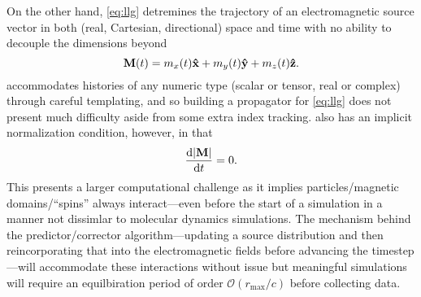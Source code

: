 On the other hand, \cref{eq:llg} detremines the trajectory of an electromagnetic source vector in both (real, Cartesian, directional) space and time with no ability to decouple the dimensions beyond
\begin{equation}
  \vb{M}(t) = m_x(t) \vu{x} + m_y(t) \vu{y} + m_z(t) \vu{z}.
\end{equation}
\QuEST{} accommodates histories of any numeric type (scalar or tensor, real or complex) through careful templating, and so building a propagator for \cref{eq:llg} does not present much difficulty aside from some extra index tracking.
 also has an implicit normalization condition, however, in that
\begin{equation}
  \dv{\abs{\vb{M}}}{t} = 0.
\end{equation}
This presents a larger computational challenge as it implies particles/magnetic domains/``spins'' always interact---even before the start of a simulation in a manner not dissimlar to molecular dynamics simulations.
The mechanism behind the predictor/corrector algorithm---updating a source distribution and then reincorporating that into the electromagnetic fields before advancing the timestep---will accommodate these interactions without issue but meaningful simulations will require an equilbiration period of order $\mathcal{O}(r_\text{max}/c)$ before collecting data.
